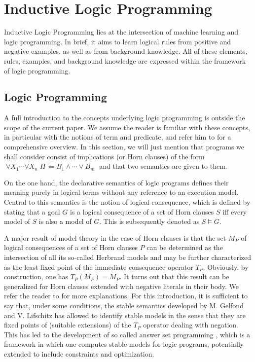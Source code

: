 \section{Inductive Logic Programming}
\label{section-popper}
\label{sect-ilp}

Inductive Logic Programming lies at the intersection of machine learning and logic programming. In brief, it aims to learn logical
rules from positive and negative examples, as well as from background knowledge. All of these elements, rules, examples, and background
knowledge are expressed within the framework of logic programming. 

\subsection{Logic Programming}

A full introduction to the concepts underlying logic programming is outside the scope of the current paper. 
We assume the reader is familiar with these concepts, in particular with the notions of term and predicate, and refer him to \cite{Lloyd} for a comprehensive overview.
%
%
In this section, we will just mention that programs we shall consider consist of implications (or Horn clauses) of the form 
\( \; \forall X_1 \cdots \forall X_n \; H \Leftarrow B_1 \wedge \cdots \vee B_m \; \)
and that two semantics are given to them. 

On the one hand, 
the declarative semantics of logic programs defines their meaning
purely in logical terms without any reference to an 
execution
model. Central to this semantics is the notion of logical consequence, which is defined by stating that a goal $G$ is a logical consequence of a set of Horn clauses $S$ iff
every model of $S$ is also a model of $G$. This is
subsequently denoted as $S \models G$.

A major result of model theory in the case of Horn clauses is that the
set $M_P$ of logical consequences of a set of Horn clauses $P$ can be determined
as the intersection of all its so-called Herbrand models and may be further
characterized as the least fixed point of the immediate consequence
operator $T_P$.
Obviously, by construction, one has $T_P(M_P) = M_P$. It turns out
that this result can be generalized for Horn clauses extended with
negative literals in their body. We refer the reader to \cite{AptBol} for
more explanations. For this introduction, it is sufficient to say that,
under some conditions, the stable semantics developed by M. Gelfond
and V. Lifschitz has allowed to identify stable models in the sense that they are fixed points of (suitable extensions) of the $T_P$ operator dealing with negation. This has led to the development of so called answer set programming \cite{lifschitz2002answer}, 
which is a framework in which one computes stable models for logic programs, potentially extended to include constraints and optimization.


